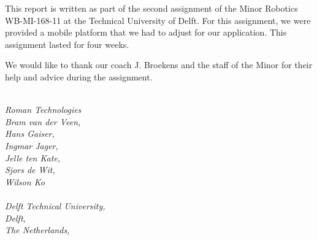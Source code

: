 \documentclass[project_eva.tex]{subfiles}
\begin{document}
This report is written as part of the second assignment of the Minor Robotics WB-MI-168-11 at the Technical University of Delft. For this assignment, we were provided a mobile platform that we had to adjust for our application. This assignment lasted for four weeks.

We would like to thank our coach J. Broekens and the staff of the Minor for their help and advice during the assignment.

\textit{
\\
Roman Technologies\\
Bram van der Veen,\\
Hans Gaiser,\\
Ingmar Jager,\\
Jelle ten Kate,\\  
Sjors de Wit,\\
Wilson Ko\\\\
Delft Technical University,\\
Delft,\\
The Netherlands,\\
}
\end{document}
